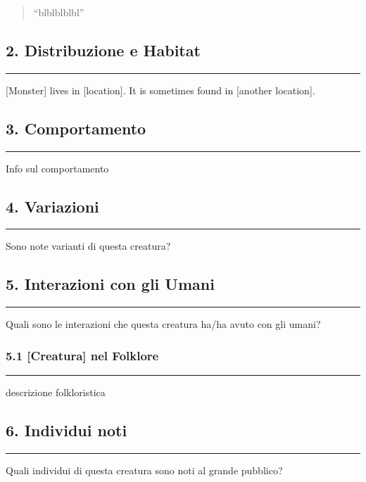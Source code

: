 \begin{quote}
``blblblblbl''
\end{quote}

\subsection{2. Distribuzione e Habitat}\label{distribuzione-e-habitat}

\begin{center}\rule{0.5\linewidth}{0.5pt}\end{center}

{[}Monster{]} lives in {[}location{]}. It is sometimes found in
{[}another location{]}.

\subsection{3. Comportamento}\label{comportamento}

\begin{center}\rule{0.5\linewidth}{0.5pt}\end{center}

Info sul comportamento

\subsection{4. Variazioni}\label{variazioni}

\begin{center}\rule{0.5\linewidth}{0.5pt}\end{center}

Sono note varianti di questa creatura?

\subsection{5. Interazioni con gli
Umani}\label{interazioni-con-gli-umani}

\begin{center}\rule{0.5\linewidth}{0.5pt}\end{center}

Quali sono le interazioni che questa creatura ha/ha avuto con gli umani?

\subsubsection{5.1 {[}Creatura{]} nel
Folklore}\label{creatura-nel-folklore}

\begin{center}\rule{0.5\linewidth}{0.5pt}\end{center}

descrizione folkloristica

\subsection{6. Individui noti}\label{individui-noti}

\begin{center}\rule{0.5\linewidth}{0.5pt}\end{center}

Quali individui di questa creatura sono noti al grande pubblico?
